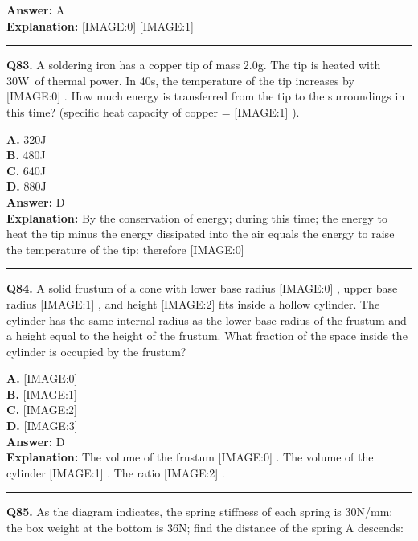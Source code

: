 \documentclass[12pt]{article}
\begin{document}
\textbf{Answer:} A \\
\textbf{Explanation:} [IMAGE:0]
[IMAGE:1]

\hrule
\vspace{1em}


\noindent
\textbf{Q83.} A soldering iron has a copper tip of mass 2.0g.
The tip is heated with 30W of thermal power. In 40s, the temperature of the tip increases by
[IMAGE:0]
.
How much energy is transferred from the tip to the surroundings in this time? (specific heat capacity of copper =
[IMAGE:1]
).



\textbf{A.} 320J \\
\textbf{B.} 480J \\
\textbf{C.} 640J \\
\textbf{D.} 880J \\

\textbf{Answer:} D \\
\textbf{Explanation:} By the conservation of energy; during this time; the energy to heat the tip minus the energy dissipated into the air equals the energy to raise the temperature of the tip: therefore
[IMAGE:0]

\hrule
\vspace{1em}


\noindent
\textbf{Q84.} A solid frustum of a cone with lower base radius
[IMAGE:0]
, upper base radius
[IMAGE:1]
, and height
[IMAGE:2]
fits inside a hollow cylinder. The cylinder has the same internal radius as the lower base radius of the frustum and a height equal to the height of the frustum. What fraction of the space inside the cylinder is occupied by the frustum?



\textbf{A.} [IMAGE:0] \\
\textbf{B.} [IMAGE:1] \\
\textbf{C.} [IMAGE:2] \\
\textbf{D.} [IMAGE:3] \\

\textbf{Answer:} D \\
\textbf{Explanation:} The volume of the frustum
[IMAGE:0]
. The volume of the cylinder
[IMAGE:1]
. The ratio
[IMAGE:2]
.

\hrule
\vspace{1em}


\noindent
\textbf{Q85.} As the diagram indicates, the spring stiffness of each spring is 30N/mm; the box weight at the bottom is 36N; find the distance of the spring A descends:
\end{document}
